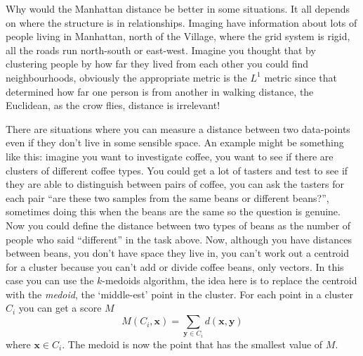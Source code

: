 \documentclass[12pt]{article}
\begin{document}
Why would the Manhattan distance be better in some situations. It all
depends on where the structure is in relationships. Imaging have
information about lots of people living in Manhattan, north of the
Village, where the grid system is rigid, all the roads run north-south
or east-west. Imagine you thought that by clustering people by how far
they lived from each other you could find neighbourhoods, obviously
the appropriate metric is the $L^1$ metric since that determined how
far one person is from another in walking distance, the Euclidean, as
the crow flies, distance is irrelevant!

There are situations where you can measure a distance between two
data-points even if they don't live in some sensible space. An example
might be something like this: imagine you want to investigate coffee,
you want to see if there are clusters of different coffee types. You
could get a lot of tasters and test to see if they are able to
distinguish between pairs of coffee, you can ask the tasters for each
pair ``are these two samples from the same beans or different
beans?'', sometimes doing this when the beans are the same so the
question is genuine. Now you could define the distance between two
types of beans as the number of people who said ``different'' in the
task above. Now, although you have distances between beans, you don't
have space they live in, you can't work out a centroid for a cluster
because you can't add or divide coffee beans, only vectors. In this
case you can use the $k$-medoids algorithm, the idea here is to
replace the centroid with the \textsl{medoid}, the `middle-est' point in
the cluster. For each point in a cluster $C_i$ you can get a score $M$
\begin{equation}
  M(C_i,\textbf{x})=\sum_{\mathbf{y}\in C_i} d(\mathbf{x},\mathbf{y})
\end{equation}
where $\mathbf{x}\in C_i$. The medoid is now the point that has the smallest value of $M$.
\end{document}
